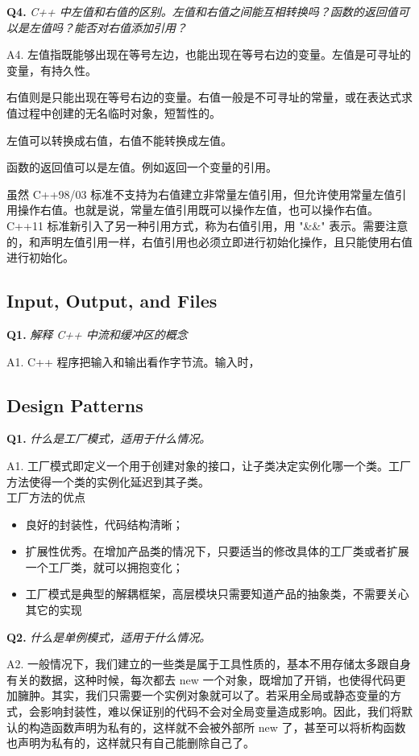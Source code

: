 \documentclass[cn,10pt,math=newtx,citestyle=gb7714-2015,bibstyle=gb7714-2015]{elegantbook}
\begin{document}
\textbf{Q4.} \textit{C++ 中左值和右值的区别。左值和右值之间能互相转换吗？函数的返回值可以是左值吗？能否对右值添加引用？}

A4. 左值指既能够出现在等号左边，也能出现在等号右边的变量。左值是可寻址的变量，有持久性。

右值则是只能出现在等号右边的变量。右值一般是不可寻址的常量，或在表达式求值过程中创建的无名临时对象，短暂性的。

左值可以转换成右值，右值不能转换成左值。

函数的返回值可以是左值。例如返回一个变量的引用。

虽然 C++98/03 标准不支持为右值建立非常量左值引用，但允许使用常量左值引用操作右值。也就是说，常量左值引用既可以操作左值，也可以操作右值。C++11 标准新引入了另一种引用方式，称为右值引用，用 "\&\&" 表示。需要注意的，和声明左值引用一样，右值引用也必须立即进行初始化操作，且只能使用右值进行初始化。


\subsection{Input, Output, and Files}

\textbf{Q1.} \textit{解释 C++ 中流和缓冲区的概念}

A1. C++ 程序把输入和输出看作字节流。输入时，

\subsection{Design Patterns}

\textbf{Q1.} \textit{什么是工厂模式，适用于什么情况。}

A1. 工厂模式即定义一个用于创建对象的接口，让子类决定实例化哪一个类。工厂方法使得一个类的实例化延迟到其子类。\\

工厂方法的优点
\begin{itemize}
  \item 良好的封装性，代码结构清晰；
  \item 扩展性优秀。在增加产品类的情况下，只要适当的修改具体的工厂类或者扩展一个工厂类，就可以拥抱变化；
  \item 工厂模式是典型的解耦框架，高层模块只需要知道产品的抽象类，不需要关心其它的实现\\
\end{itemize}


\textbf{Q2.} \textit{什么是单例模式，适用于什么情况。}

A2. 一般情况下，我们建立的一些类是属于工具性质的，基本不用存储太多跟自身有关的数据，这种时候，每次都去 new 一个对象，既增加了开销，也使得代码更加臃肿。其实，我们只需要一个实例对象就可以了。若采用全局或静态变量的方式，会影响封装性，难以保证别的代码不会对全局变量造成影响。因此，我们将默认的构造函数声明为私有的，这样就不会被外部所 new 了，甚至可以将析构函数也声明为私有的，这样就只有自己能删除自己了。\\
\end{document}
